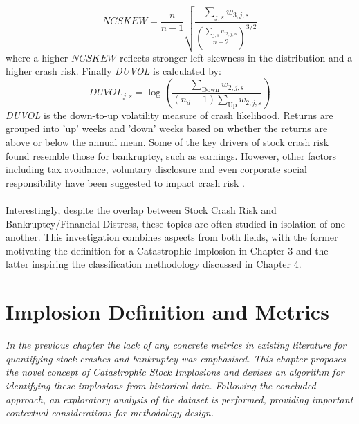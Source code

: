 \documentclass[a4paper]{report}
\begin{document}
\[
\textit{NCSKEW} = \frac{n}{n-1} \sqrt{\frac{\sum_{j,s} w_{3,j,s}}{\left(\frac{\sum_{j,s} w_{2,j,s}}{n-2}\right)^{3/2}}}
\]
where a higher \(\textit{NCSKEW}\) reflects stronger left-skewness in the distribution and a higher crash risk. Finally \textit{DUVOL} is calculated by: 
\[
  \textit{DUVOL}_{j,s} = \log\left(\frac{\sum_{\text{Down}} w_{2,j,s}}{(n_d - 1)\sum_{\text{Up}} w_{2,j,s}}\right)
\]
\textit{DUVOL} is the down-to-up volatility measure of crash likelihood. Returns
are grouped into 'up' weeks and 'down' weeks based on whether the returns are above or below the annual mean. Some of the key drivers of stock crash risk found resemble those for bankruptcy, such as earnings. However, other factors including 
tax avoidance, voluntary disclosure and even corporate social responsibility have been suggested to impact crash risk \citep{habib2018stock}.\\\\Interestingly, despite the overlap 
between Stock Crash Risk and Bankruptcy/Financial Distress, these topics are often studied in isolation of one another. This investigation combines aspects from both fields, with the former motivating the definition for 
a Catastrophic Implosion in Chapter 3 and the latter inspiring the classification methodology discussed in Chapter 4.


\chapter{Implosion Definition and Metrics}
\textit{In the previous chapter the lack of any concrete metrics in existing literature for quantifying stock crashes and bankruptcy was emphasised. This chapter 
proposes the novel concept of Catastrophic Stock Implosions and devises an algorithm for identifying these implosions from historical data. Following the concluded approach, an exploratory analysis of the dataset is performed, providing important
contextual considerations for methodology design.}
\end{document}

